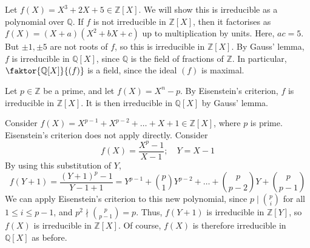 \begin{example}
	Let \( f(X) = X^3 + 2X + 5 \in \mathbb Z[X] \).
	We will show this is irreducible as a polynomial over \( \mathbb Q \).
	If \( f \) is not irreducible in \( \mathbb Z[X] \), then it factorises as \( f(X) = (X+a)(X^2 + bX + c) \) up to multiplication by units.
	Here, \( ac = 5 \).
	But \( \pm 1, \pm 5 \) are not roots of \( f \), so this is irreducible in \( \mathbb Z[X] \).
	By Gauss' lemma, \( f \) is irreducible in \( \mathbb Q[X] \), since \( \mathbb Q \) is the field of fractions of \( \mathbb Z \).
	In particular, \( \faktor{\mathbb Q[X]}{(f)} \) is a field, since the ideal \( (f) \) is maximal.
\end{example}
\begin{example}
	Let \( p \in \mathbb Z \) be a prime, and let \( f(X) = X^n - p \).
	By Eisenstein's criterion, \( f \) is irreducible in \( \mathbb Z[X] \).
	It is then irreducible in \( \mathbb Q[X] \) by Gauss' lemma.
\end{example}
\begin{example}
	Consider \( f(X) = X^{p-1} + X^{p-2} + \dots + X + 1 \in \mathbb Z[X] \), where \( p \) is prime.
	Eisenstein's criterion does not apply directly.
	Consider
	\[
		f(X) = \frac{X^p - 1}{X - 1};\quad Y = X - 1
	\]
	By using this substitution of \( Y \),
	\[
		f(Y+1) = \frac{(Y+1)^p - 1}{Y-1 + 1} = Y^{p-1} + \binom{p}{1} Y^{p-2} + \dots + \binom{p}{p-2} Y + \binom{p}{p-1}
	\]
	We can apply Eisenstein's criterion to this new polynomial, since \( p \mid \binom{p}{i} \) for all \( 1 \leq i \leq p - 1 \), and \( p^2 \nmid \binom{p}{p-1} = p \).
	Thus, \( f(Y+1) \) is irreducible in \( \mathbb Z[Y] \), so \( f(X) \) is irreducible in \( \mathbb Z[X] \).
	Of course, \( f(X) \) is therefore irreducible in \( \mathbb Q[X] \) as before.
\end{example}
